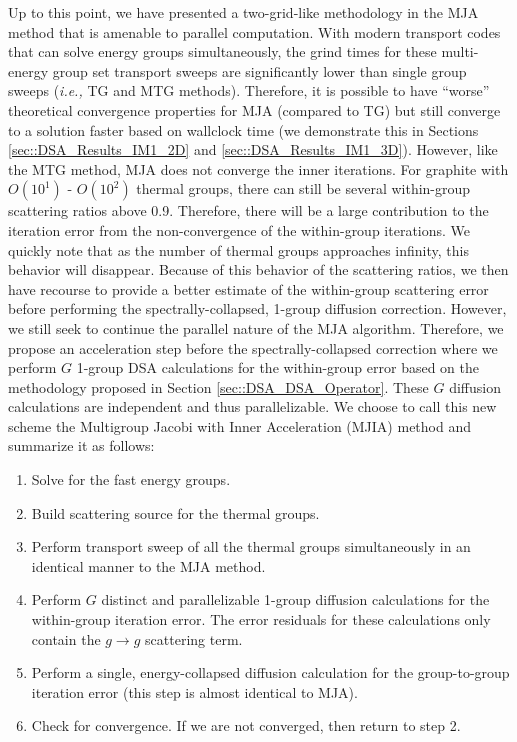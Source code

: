 Up to this point, we have presented a two-grid-like methodology in the MJA method that is amenable to parallel computation. With modern transport codes that can solve energy groups simultaneously, the grind times for these multi-energy group set transport sweeps are significantly lower than single group sweeps ({\em i.e.,} TG and MTG methods). Therefore, it is possible to have ``worse'' theoretical convergence properties for MJA (compared to TG) but still converge to a solution faster based on wallclock time (we demonstrate this in Sections \ref{sec::DSA_Results_IM1_2D} and \ref{sec::DSA_Results_IM1_3D}). However, like the MTG method, MJA does not converge the inner iterations. For graphite with $O(10^1)$ - $O(10^2)$ thermal groups, there can still be several within-group scattering ratios above 0.9. Therefore, there will be a large contribution to the iteration error from the non-convergence of the within-group iterations. We quickly note that as the number of thermal groups approaches infinity, this behavior will disappear. Because of this behavior of the scattering ratios, we then have recourse to provide a better estimate of the within-group scattering error before performing the spectrally-collapsed, 1-group diffusion correction. However, we still seek to continue the parallel nature of the MJA algorithm. Therefore, we propose an acceleration step before the spectrally-collapsed correction where we perform $G$ 1-group DSA calculations for the within-group error based on the methodology proposed in Section \ref{sec::DSA_DSA_Operator}. These $G$ diffusion calculations are independent and thus parallelizable. We choose to call this new scheme the Multigroup Jacobi with Inner Acceleration (MJIA) method and summarize it as follows:


\begin{enumerate}
\item Solve for the fast energy groups.
\item Build scattering source for the thermal groups.
\item Perform transport sweep of all the thermal groups simultaneously in an identical manner to the MJA method.
\item Perform $G$ distinct and parallelizable 1-group diffusion calculations for the within-group iteration error. The error residuals for these calculations only contain the $g\rightarrow g$ scattering term.
\item Perform a single, energy-collapsed diffusion calculation for the group-to-group iteration error (this step is almost identical to MJA).
\item Check for convergence. If we are not converged, then return to step 2.
\end{enumerate}

